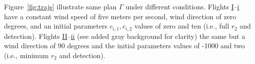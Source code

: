 \documentclass[letterpaper,10pt,journal,twoside]{IEEEtran}
\newcommand{\figpath}{./figures}
\theoremstyle{definition}
\begin{document}
%  
%  
%  


Figure~\ref{fig:trajs} illustrate same plan $\Gamma$ under different conditions. Flights \hyperref[fig:trajs-I-static]{I}--\hyperref[fig:trajs-dyn-i]{i} have a constant wind speed of five meters per second, wind direction of zero degrees, and an initial parameters $c_{i,1},c_{i,2}$ values of zero and ten (i.e., full $r_2$ and detection). Flights \hyperref[fig:trajs-II-static]{II}--\hyperref[fig:trajs-dyn-ii]{ii} (see added gray background for clarity) the same but a wind direction of 90 degrees and the initial parameters values of -1000 and two (i.e., minimum $r_2$ and detection). 
\end{document}
